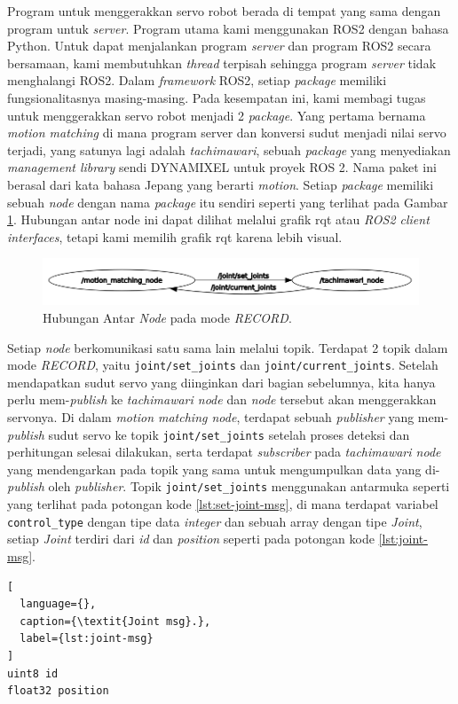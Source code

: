 Program untuk menggerakkan servo robot berada di tempat yang sama dengan program untuk \textit{server}. Program utama kami menggunakan ROS2 dengan bahasa Python. Untuk dapat menjalankan program \textit{server} dan program ROS2 secara bersamaan, kami membutuhkan \textit{thread} terpisah sehingga program \textit{server} tidak menghalangi ROS2.
Dalam \textit{framework} ROS2, setiap \textit{package} memiliki fungsionalitasnya masing-masing. Pada kesempatan ini, kami membagi tugas untuk menggerakkan servo robot menjadi 2 \textit{package}. Yang pertama bernama \emph{motion matching} di mana program server dan konversi sudut menjadi nilai servo terjadi, yang satunya lagi adalah \emph{tachimawari}, sebuah \textit{package} yang menyediakan \textit{management library} sendi DYNAMIXEL untuk proyek ROS 2.
Nama paket ini berasal dari kata bahasa Jepang yang berarti \textit{motion}. Setiap \textit{package} memiliki sebuah \textit{node} dengan nama \textit{package} itu sendiri seperti yang terlihat pada Gambar \ref{fig:relation-node-record-mode}.
Hubungan antar node ini dapat dilihat melalui grafik rqt atau \textit{ROS2 client interfaces}, tetapi kami memilih grafik rqt karena lebih visual.
\begin{figure}[ht]
  \centering
  \includegraphics[scale=0.62]{gambar/rqt_without_akushon.png}
  \caption{Hubungan Antar \textit{Node} pada mode \textit{RECORD}.}
  \label{fig:relation-node-record-mode}
\end{figure}

Setiap \textit{node} berkomunikasi satu sama lain melalui topik. Terdapat 2 topik dalam mode \textit{RECORD}, yaitu \verb|joint/set_joints| dan \verb|joint/current_joints|.
Setelah mendapatkan sudut servo yang diinginkan dari bagian sebelumnya, kita hanya perlu mem-\textit{publish} ke \emph{tachimawari node} dan \textit{node} tersebut akan menggerakkan servonya. Di dalam \emph{motion matching node}, terdapat sebuah \emph{publisher} yang mem-\textit{publish} sudut servo ke topik \verb|joint/set_joints| setelah proses deteksi dan
perhitungan selesai dilakukan, serta terdapat \emph{subscriber} pada \emph{tachimawari node} yang mendengarkan pada topik yang sama untuk mengumpulkan data yang di-\textit{publish} oleh \emph{publisher}. Topik \verb|joint/set_joints| menggunakan antarmuka seperti yang terlihat pada potongan kode \ref{lst:set-joint-msg}, di mana terdapat variabel \verb|control_type| dengan tipe data \textit{integer} dan sebuah array dengan tipe \textit{Joint}, setiap \textit{Joint} terdiri dari \textit{id} dan \textit{position} seperti pada potongan kode \ref{lst:joint-msg}.
\begin{lstlisting}[
  language={},
  caption={\textit{Joint msg}.},
  label={lst:joint-msg}
]
uint8 id
float32 position
\end{lstlisting}

